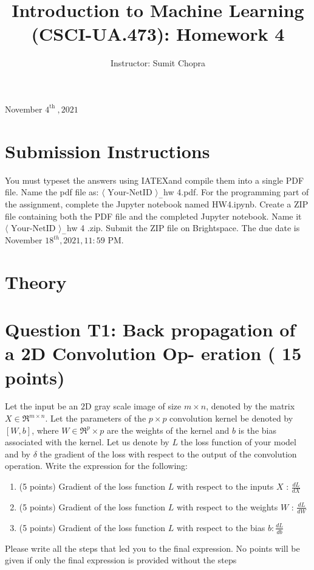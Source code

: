 \documentclass[10pt]{article}
\title{Introduction to Machine Learning (CSCI-UA.473): Homework 4 }
\author{Instructor: Sumit Chopra}
\date{}
\begin{document}
\maketitle

November $4^{\text {th }}, 2021$

\section*{Submission Instructions }
You must typeset the answers using IATEXand compile them into a single PDF file. Name the pdf file as: $\langle\text { Your-NetID }\rangle_{-}$hw 4.pdf. For the programming part of the assignment, complete the Jupyter notebook named HW4.ipynb. Create a ZIP file containing both the PDF file and the completed Jupyter notebook. Name it $\langle\text { Your-NetID }\rangle_{-}$hw 4 .zip. Submit the ZIP file on Brightspace. The due date is November $18^{t h}, 2021,11: 59$ PM.

\section{Theory}
\section{Question T1: Back propagation of a 2D Convolution Op- eration ( 15 points)}
Let the input be an $2 \mathrm{D}$ gray scale image of size $m \times n$, denoted by the matrix $X \in \Re^{m \times n}$. Let the parameters of the $p \times p$ convolution kernel be denoted by $[W, b]$, where $W \in \Re^{p} \times p$ are the weights of the kernel and $b$ is the bias associated with the kernel. Let us denote by $L$ the loss function of your model and by $\delta$ the gradient of the loss with respect to the output of the convolution operation. Write the expression for the following:

\begin{enumerate}
  \item (5 points) Gradient of the loss function $L$ with respect to the inputs $X$ : $\frac{d L}{d X}$

  \item (5 points) Gradient of the loss function $L$ with respect to the weights $W$ : $\frac{d L}{d W}$

  \item (5 points) Gradient of the loss function $L$ with respect to the bias $b: \frac{d L}{d b}$

\end{enumerate}
Please write all the steps that led you to the final expression. No points will be given if only the final expression is provided without the steps
\end{document}
